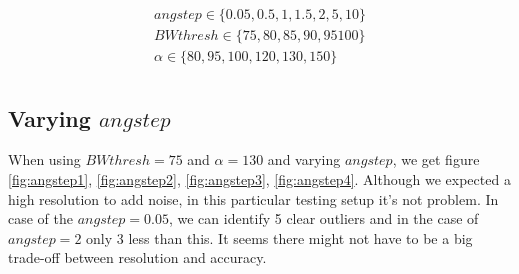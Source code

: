 \documentclass[a4paper, 20pt]{article}
\begin{document}
\begin{align*}
    angstep  \in \{0.05, 0.5, 1, 1.5, 2, 5, 10\}\\
    BWthresh \in \{75, 80, 85, 90, 95 100\}\\
    \alpha   \in \{80, 95, 100, 120, 130, 150\}\\
\end{align*}

\subsection{Varying $angstep$}

When using $BWthresh = 75 $ and $\alpha = 130$ and varying $angstep$, we get
figure \ref{fig:angstep1}, \ref{fig:angstep2}, \ref{fig:angstep3},
\ref{fig:angstep4}. Although we expected a high resolution to add noise,
in this particular testing setup it's not problem.
In case of the $angstep = 0.05$, we can identify 5 clear outliers and
in the case of $angstep =2$ only 3 less than this. It seems there might not have to
be a big trade-off between resolution and accuracy.
\begin{figure}[!ht]
\centering
\begin{floatrow}
\end{floatrow}
\end{figure}
\end{document}
